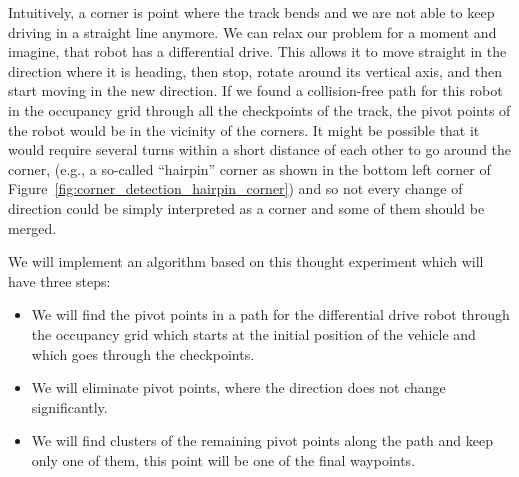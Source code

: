 Intuitively, a corner is point where the track bends and we are not able to keep driving in a straight line anymore. We can relax our problem for a moment and imagine, that robot has a differential drive. This allows it to move straight in the direction where it is heading, then stop, rotate around its vertical axis, and then start moving in the new direction. If we found a collision-free path for this robot in the occupancy grid through all the checkpoints of the track, the pivot points of the robot would be in the vicinity of the corners. It might be possible that it would require several turns within a short distance of each other to go around the corner, (e.g., a so-called ``hairpin'' corner as shown in the bottom left corner of Figure~\ref{fig:corner_detection_hairpin_corner}) and so not every change of direction could be simply interpreted as a corner and some of them should be merged.

We will implement an algorithm based on this thought experiment which will have three steps:
\begin{itemize}
	\item We will find the pivot points in a path for the differential drive robot through the occupancy grid which starts at the initial position of the vehicle and which goes through the checkpoints.
	\item We will eliminate pivot points, where the direction does not change significantly.
	\item We will find clusters of the remaining pivot points along the path and keep only one of them, this point will be one of the final waypoints.
\end{itemize}

